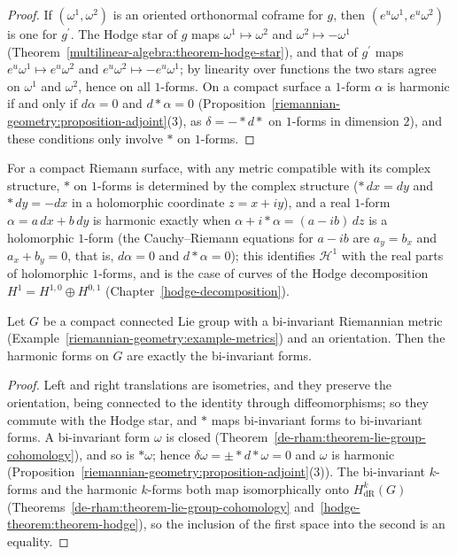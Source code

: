 \begin{proof}
If $(\omega^1, \omega^2)$ is an oriented orthonormal coframe for $g$, then $(e^u\omega^1, e^u\omega^2)$ is one for $g^{\prime}$. The Hodge star of $g$ maps $\omega^1 \mapsto \omega^2$ and $\omega^2 \mapsto -\omega^1$
(Theorem~\ref{multilinear-algebra:theorem-hodge-star}), and that of $g^{\prime}$ maps $e^u\omega^1 \mapsto e^u\omega^2$ and $e^u\omega^2 \mapsto -e^u\omega^1$; by linearity over functions the two stars agree on
$\omega^1$ and $\omega^2$, hence on all $1$-forms. On a compact surface a $1$-form $\alpha$ is harmonic if and only if $d\alpha = 0$ and $d{*}\alpha = 0$
(Proposition~\ref{riemannian-geometry:proposition-adjoint}(3), as $\delta = -{*}d{*}$ on $1$-forms in dimension $2$), and these conditions only involve $*$ on $1$-forms.
\end{proof}

For a compact Riemann surface, with any metric compatible with its complex structure, $*$ on $1$-forms is determined by the complex structure ($*\,dx = dy$ and $*\,dy = -dx$ in a holomorphic coordinate
$z = x + iy$), and a real $1$-form $\alpha = a\,dx + b\,dy$ is harmonic exactly when $\alpha + i{*}\alpha = (a - ib)\,dz$ is a holomorphic $1$-form (the Cauchy--Riemann equations for $a - ib$ are
$a_y = b_x$ and $a_x + b_y = 0$, that is, $d\alpha = 0$ and $d{*}\alpha = 0$); this identifies $\mathcal{H}^1$ with the real parts of holomorphic $1$-forms, and is the
case of curves of the Hodge decomposition $H^1 = H^{1,0} \oplus H^{0,1}$ (Chapter~\ref{hodge-decomposition}).

\begin{proposition}\label{hodge-theorem:proposition-lie-group-harmonic}
Let $G$ be a compact connected Lie group with a bi-invariant Riemannian metric (Example~\ref{riemannian-geometry:example-metrics}) and an orientation. Then the harmonic forms on $G$ are exactly the bi-invariant forms.
\end{proposition}

\begin{proof}
Left and right translations are isometries, and they preserve the orientation, being connected to the identity through diffeomorphisms; so they commute with the Hodge star, and $*$ maps bi-invariant forms to bi-invariant forms. A bi-invariant
form $\omega$ is closed (Theorem~\ref{de-rham:theorem-lie-group-cohomology}), and so is $*\omega$; hence $\delta\omega = \pm{*}d{*}\omega = 0$ and $\omega$ is harmonic (Proposition~\ref{riemannian-geometry:proposition-adjoint}(3)). The
bi-invariant $k$-forms and the harmonic $k$-forms both map isomorphically onto $H^k_{\mathrm{dR}}(G)$ (Theorems~\ref{de-rham:theorem-lie-group-cohomology} and~\ref{hodge-theorem:theorem-hodge}), so the inclusion of the first
space into the second is an equality.
\end{proof}

